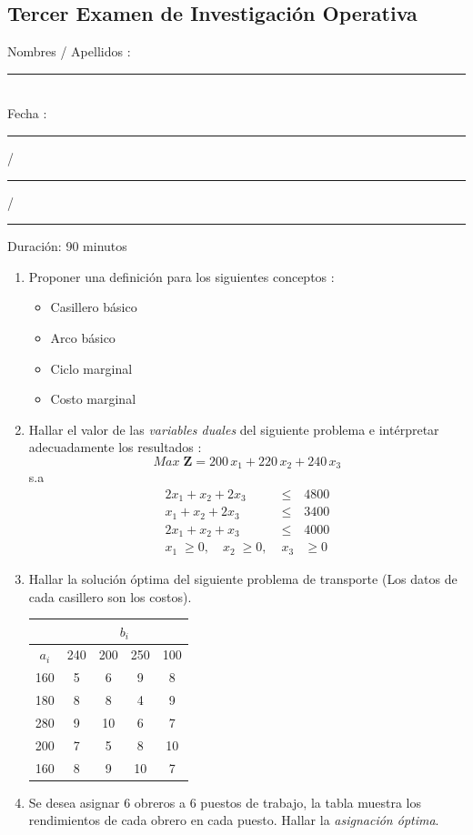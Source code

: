 \documentclass[10pt, a4paper]{article}
\begin{document}
\begin{center}
\subsection*{Tercer Examen de Investigación Operativa} 
\end{center}

\noindent Nombres / Apellidos : \rule{10cm}{0.4pt} \\ 
Fecha : \rule{2cm}{0.4pt}  / \rule{2cm}{0.4pt} / \rule{2cm}{0.4pt} \hspace{3.4cm} Duración: {\small 90 minutos} \\

\begin{enumerate}
\item{Proponer una definición para los siguientes conceptos :
\begin{itemize}
\item{Casillero básico} 
\item{Arco básico}
\item{Ciclo marginal}
\item{Costo marginal}
\end{itemize}
}
\item{Hallar el valor de las \emph{variables duales} del siguiente problema e intérpretar adecuadamente los resultados :
$$Max\;\mathbf{Z} = 200\,x_{1} + 220\,x_{2} + 240\,x_{3}$$
s.a
\begin{eqnarray*}
2 x_{1} + x_{2} + 2 x_{3} & \leq & 4800 \\
x_{1} + x_{2} + 2 x_{3} & \leq & 3400 \\
2 x_{1} + x_{2} + x_{3} & \leq & 4000 \\
x_{1}\;\geq 0,\quad x_{2}\;\geq 0,\; & x_{3} & \geq 0 
\end{eqnarray*}
}
\item{Hallar la solución óptima del siguiente problema de transporte ({\small Los datos de cada casillero son los costos}).

\begin{center}
	\begin{tabular}{|c|c|c|c|c|}
		\hline 
		\empty & \multicolumn{4}{c|}{$b_{i}$} \\
		\hline
		$a_{i}$ & 240 & 200 & 250 & 100 \\
		\hline 
		160 & 5 & 6 & 9 & 8 \\
		180 & 8 & 8 & 4 & 9 \\
		280 & 9 & 10 & 6 & 7 \\
		200 & 7 & 5 & 8 & 10 \\
		160 & 8 & 9 & 10 & 7 \\
		\hline
	\end{tabular}
\end{center}
}
\item{Se desea asignar $6$ obreros a $6$ puestos de trabajo, la tabla muestra los rendimientos de cada obrero en cada puesto. Hallar la \emph{asignación óptima}.

}
\end{enumerate}
\end{document}
